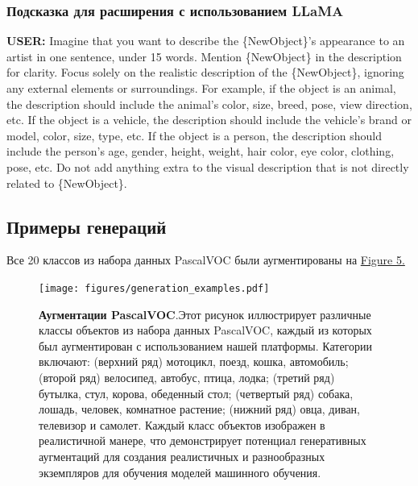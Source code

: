 \documentclass[11pt]{article}
\begin{document}
\subsubsection{Подсказка для расширения с использованием LLaMA}

\begin{tcolorbox}[
  colback=lightgray, %
  boxrule=1pt, %
]\textbf{USER:} Imagine that you want to describe the \{NewObject\}'s appearance to an artist in one sentence, under 15 words. Mention \{NewObject\} in the description for clarity. Focus solely on the realistic description of the \{NewObject\}, ignoring any external elements or surroundings.
For example, if the object is an animal, the description should include the animal's color, size, breed, pose, view direction, etc. If the object is a vehicle, the description should include the vehicle's brand or model, color, size, type, etc. If the object is a person, the description should include the person's age, gender, height, weight, hair color, eye color, clothing, pose, etc.
Do not add anything extra to the visual description that is not directly related to \{NewObject\}.\\
\end{tcolorbox}


\subsection{Примеры генераций} Все 20 классов из набора данных PascalVOC были аугментированы на  \hyperref[fig:generation_examples]{Figure 5.}


\begin{figure}[h]
    \centering
    \texttt{[image: figures/generation\_examples.pdf]}
    \caption{\textbf{Аугментации PascalVOC}.Этот рисунок иллюстрирует различные классы объектов из набора данных PascalVOC, каждый из которых был аугментирован с использованием нашей платформы. Категории включают: (верхний ряд) мотоцикл, поезд, кошка, автомобиль; (второй ряд) велосипед, автобус, птица, лодка; (третий ряд) бутылка, стул, корова, обеденный стол; (четвертый ряд) собака, лошадь, человек, комнатное растение; (нижний ряд) овца, диван, телевизор и самолет. Каждый класс объектов изображен в реалистичной манере, что демонстрирует потенциал генеративных аугментаций для создания реалистичных и разнообразных экземпляров для обучения моделей машинного обучения.}
    \label{fig:generation_examples}
\end{figure}
\end{document}
